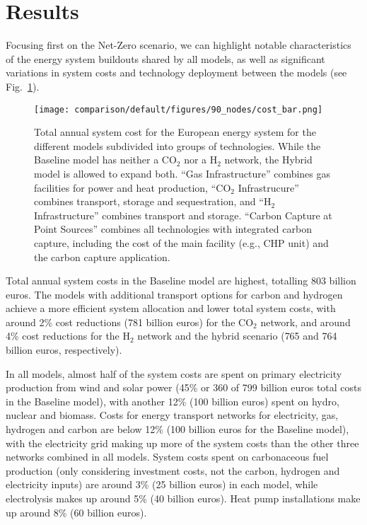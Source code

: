 \documentclass[twocolumn]{article}
\newcommand{\carbon}{CO$_2$}
\newcommand{\hydrogen}{H$_2$}
\begin{document}
\section{Results}
\label{sec:results}


Focusing first on the Net-Zero scenario, we can highlight notable characteristics of the energy system buildouts shared by all models, as well as significant variations in system costs and technology deployment between the models (see Fig.~\ref{fig:cost_bar}).

\begin{figure}[ht!]
    \centering
    \texttt{[image: comparison/default/figures/90\_nodes/cost\_bar.png]}
    \caption[short]{Total annual system cost for the European energy system for the different models subdivided into groups of technologies. While the Baseline model has neither a \carbon{} nor a \hydrogen{} network, the Hybrid model is allowed to expand both. ``Gas Infrastructure'' combines gas facilities for power and heat production, ``\carbon{} Infrastrucure'' combines transport, storage and sequestration, and ``H$_2$ Infrastructure'' combines transport and storage. ``Carbon Capture at Point Sources'' combines all technologies with integrated carbon capture, including the cost of the main facility (e.g., CHP unit) and the carbon capture application.}
    \label{fig:cost_bar}
\end{figure}

Total annual system costs in the Baseline model are highest, totalling \label{}803 billion euros. The models with additional transport options for carbon and hydrogen achieve a more efficient system allocation and lower total system costs, with around \label{}2\% cost reductions (\label{}781 billion euros) for the \carbon{} network, and around \label{}4\% cost reductions for the \hydrogen{} network and the hybrid scenario (\label{}765 and \label{}764 billion euros, respectively).

In all models, almost half of the system costs are spent on primary electricity production from wind and solar power (\label{}45\% or \label{}360 of \label{}799 billion euros total costs in the Baseline model), with another \label{}12\% (\label{}100 billion euros) spent on hydro, nuclear and biomass. Costs for energy transport networks for electricity, gas, hydrogen and carbon are below \label{}12\% (\label{}100 billion euros for the Baseline model), with the electricity grid making up more of the system costs than the other three networks combined in all models. System costs spent on carbonaceous fuel production (only considering investment costs, not the carbon, hydrogen and electricity inputs) are around \label{}3\% (\label{}25 billion euros) in each model, while electrolysis makes up around \label{}5\% (\label{}40 billion euros). Heat pump installations make up around \label{}8\% (60 billion euros).
\end{document}
